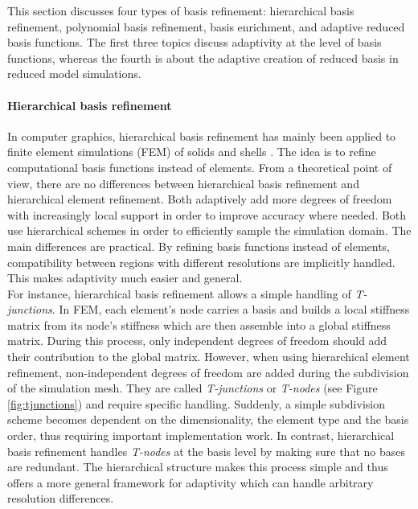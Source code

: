 This section discusses four types of basis refinement: hierarchical basis refinement, polynomial basis refinement, basis enrichment, and adaptive reduced basis functions.
The first three topics discuss adaptivity at the level of basis functions, whereas the fourth is about the adaptive creation of reduced basis in reduced model simulations.

\paragraph*{Hierarchical basis refinement}
In computer graphics, hierarchical basis refinement has mainly been applied to finite element simulations (FEM) of solids and shells \cite{Capell2002,Grinspun2002}. The idea is to refine computational basis functions instead of elements. From a theoretical point of view, there are no differences between hierarchical basis refinement and hierarchical element refinement. Both adaptively add more degrees of freedom with increasingly local support in order to improve accuracy where needed. Both use hierarchical schemes in order to efficiently sample the simulation domain.
The main differences are practical. By refining basis functions instead of elements, compatibility between regions with different resolutions are implicitly handled.
This makes adaptivity much easier and general.
\\
For instance, hierarchical basis refinement allows a simple handling of \emph{T-junctions}.
In FEM, each element's node carries a basis and builds a local stiffness matrix from its node's stiffness which are then assemble into a global stiffness matrix.
During this process, only independent degrees of freedom should add their contribution to the global matrix. However, when using hierarchical element refinement, non-independent degrees of freedom are added during the subdivision of the simulation mesh. They are called \emph{T-junctions} or \emph{T-nodes} (see Figure \ref{fig:tjunctions}) and require specific handling. Suddenly, a simple subdivision scheme becomes dependent on the dimensionality, the element type and the basis order, thus requiring important implementation work. In contrast, hierarchical basis refinement handles \emph{T-nodes} at the basis level by making sure that no bases are redundant. The hierarchical structure makes this process simple and thus offers a more general framework for adaptivity which can handle arbitrary resolution differences.
